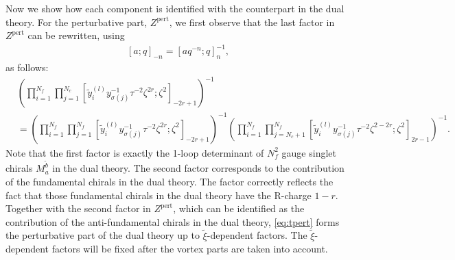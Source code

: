 \documentclass[a4paper,11pt]{article}
\begin{document}
Now we show how each component is identified with the counterpart in the dual theory. For the perturbative part, $Z^\text{pert}$, we first observe that the last factor in $Z^\text{pert}$ can be rewritten, using
\begin{align}
\left[a;q\right]_{-n} = \left[a q^{-n};q\right]_n^{-1},
\end{align}
as follows:
\begin{align}
\label{eq:tpert}
%
& \left(\prod_{i = 1}^{N_f} \prod_{j = 1}^{N_c} \left[\tilde y^{(l)}_i y_{\sigma(j)}^{-1} \tau^{-2} \zeta^{2 r};\zeta^2\right]_{-2 r+1}\right)^{-1} \nonumber \\
%
%
&= \left(\prod_{i = 1}^{N_f} \prod_{j = 1}^{N_f} \left[\tilde y^{(l)}_i y_{\sigma(j)}^{-1} \tau^{-2} \zeta^{2 r};\zeta^2\right]_{-2 r+1}\right)^{-1} \left(\prod_{i = 1}^{N_f} \prod_{j = N_c+1}^{N_f} \left[\tilde y^{(l)}_i y_{\sigma(j)}^{-1} \tau^{-2} \zeta^{2-2 r};\zeta^2\right]_{2 r-1}\right)^{-1}.
%
\end{align}
Note that the first factor is exactly the 1-loop determinant of $N_f^2$ gauge singlet chirals $M_a^{\tilde b}$ in the dual theory. The second factor corresponds to the contribution of the fundamental chirals in the dual theory. The factor correctly reflects the fact that those fundamental chirals in the dual theory have the R-charge $1-r$. Together with the second factor in $Z^\text{pert}$, which can be identified as the contribution of the anti-fundamental chirals in the dual theory, \eqref{eq:tpert} forms the perturbative part of the dual theory up to $\tilde \xi$-dependent factors. The $\tilde \xi$-dependent factors will be fixed after the vortex parts are taken into account.
\end{document}
